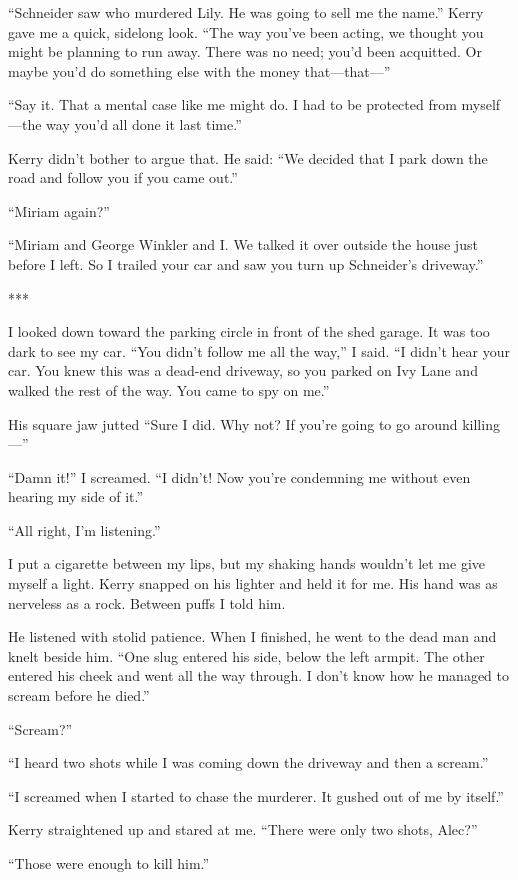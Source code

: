 {“Schneider saw who murdered Lily. He was going to sell me the name.” Kerry gave me a quick, sidelong look. “The way you’ve been acting, we thought you might be planning to run away. There was no need; you’d been acquitted. Or maybe you’d do something else with the money that—that—”

“Say it. That a mental case like me might do. I had to be protected from myself—the way you’d all done it last time.”

Kerry didn’t bother to argue that. He said: “We decided that I park down the road and follow you if you came out.”

“Miriam again?”

“Miriam and George Winkler and I. We talked it over outside the house just before I left. So I trailed your car and saw you turn up Schneider’s driveway.”

***

I looked down toward the parking circle in front of the shed garage. It was too dark to see my car. “You didn’t follow me all the way,” I said. “I didn’t hear your car. You knew this was a dead-end driveway, so you parked on Ivy Lane and walked the rest of the way. You came to spy on me.”

His square jaw jutted “Sure I did. Why not? If you’re going to go around killing—”

“Damn it!” I screamed. “I didn’t! Now you’re condemning me without even hearing my side of it.”

“All right, I’m listening.”

I put a cigarette between my lips, but my shaking hands wouldn’t let me give myself a light. Kerry snapped on his lighter and held it for me. His hand was as nerveless as a rock. Between puffs I told him.

He listened with stolid patience. When I finished, he went to the dead man and knelt beside him. “One slug entered his side, below the left armpit. The other entered his cheek and went all the way through. I don’t know how he managed to scream before he died.”

“Scream?”

“I heard two shots while I was coming down the driveway and then a scream.”

“I screamed when I started to chase the murderer. It gushed out of me by itself.”

Kerry straightened up and stared at me. “There were only two shots, Alec?”

“Those were enough to kill him.”

}
